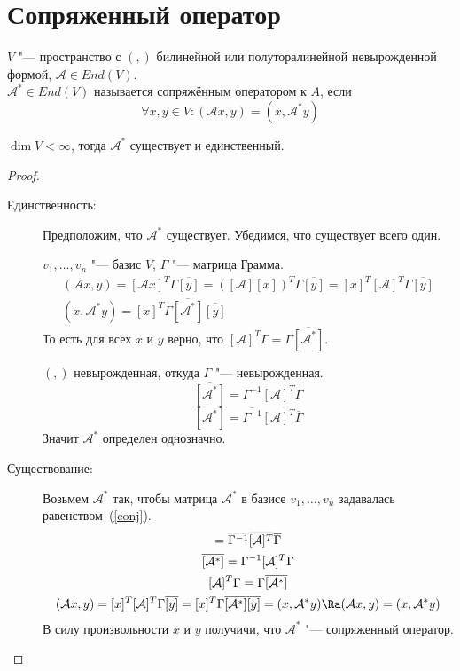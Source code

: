 \section{Сопряженный оператор}

\begin{Def}
	$V$ "--- пространство с $(,)$ билинейной или полуторалинейной невырожденной формой, $\mathcal A \in End(V)$.\\
	$\mathcal A^* \in End(V)$ называется сопряжённым оператором к $A$, если
$$\forall x, y \in V \colon (\mathcal Ax, y) = (x, \mathcal A^*y)$$
\end{Def}

\begin{theorem}
	$\dim V < \infty$, тогда $\mathcal A^*$ существует и единственный.
\end{theorem}
\begin{proof}
	\begin{description}
	\item[Единственность:]
		Предположим, что $\mathcal A^*$ существует.
		Убедимся, что существует всего один.

		$v_1, \dots, v_n$ "--- базис $V$,
		$\Gamma$ "--- матрица Грамма.
		\begin{gather*}
			(\mathcal Ax, y) = [\mathcal Ax]^T \Gamma \overline{[y]}
			= ([\mathcal A][x])^T \Gamma \overline{[y]}
			= [x]^T [\mathcal A]^T \Gamma \overline{[y]} \\
			(x, \mathcal A^* y) = [x]^T \Gamma \overline{[\mathcal A^*]} \overline{[y]}
		\end{gather*}
		То есть для всех $x$ и $y$ верно, что $[\mathcal A]^T \Gamma = \Gamma \overline{[\mathcal A^*]}$.

		$(,)$ невырожденная, откуда $\Gamma$ "--- невырожденная.
		\[ \overline{[\mathcal A^*]} = \Gamma^{-1} [\mathcal A]^T \Gamma \]
		\begin{equation}\label{conj}
			[\mathcal A^*] = \overline{\Gamma^{-1}} \overline{[\mathcal A]^T}\overline{\Gamma}
		\end{equation}
		Значит $\mathcal A^*$ определен однозначно.

	\item[Существование:]
		Возьмем $\mathcal A^*$ так, чтобы матрица $\mathcal A^*$ в базисе $v_1, \dots, v_n$ задавалась равенством~(\ref{conj}).
		\begin{gather*}
			[\mathcal A^*] = \overline{\Gamma^{-1}} \overline{[\mathcal A]^T} \overline{\Gamma} \\
			\overline{[\mathcal A^*]} = \Gamma^{-1} [\mathcal A]^T \Gamma \\
			[\mathcal A]^T \Gamma = \Gamma \overline{[\mathcal A^*]} \\
			(\mathcal Ax, y) = [x]^T [\mathcal A]^T \Gamma \overline{[y]}
			= [x]^T \Gamma \overline{[\mathcal A^*]} \overline{[y]} = (x, \mathcal A^*y)
			\Ra (\mathcal Ax, y) = (x,  \mathcal A^*y)
		\end{gather*}
		В силу произвольности $x$ и $y$ получичи, что $\mathcal A^*$ "--- сопряженный оператор.
	\end{description}
\end{proof}

